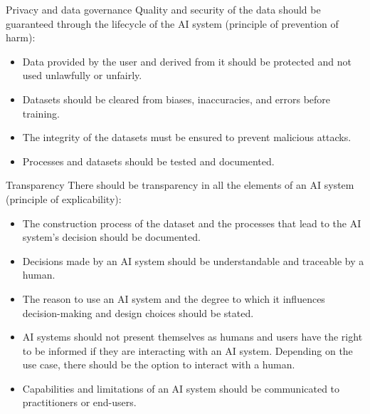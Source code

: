 \begin{descriptionlist}
    \item[Privacy and data governance] 
        Quality and security of the data should be guaranteed through the lifecycle of the AI system (principle of prevention of harm):
        \begin{itemize}
            \item Data provided by the user and derived from it should be protected and not used unlawfully or unfairly.
            \item Datasets should be cleared from biases, inaccuracies, and errors before training.
            \item The integrity of the datasets must be ensured to prevent malicious attacks.
            \item Processes and datasets should be tested and documented.
        \end{itemize}


    \item[Transparency] 
        There should be transparency in all the elements of an AI system (principle of explicability):
        \begin{itemize}
            \item The construction process of the dataset and the processes that lead to the AI system's decision should be documented.
            \item Decisions made by an AI system should be understandable and traceable by a human.
            \item The reason to use an AI system and the degree to which it influences decision-making and design choices should be stated.
            \item AI systems should not present themselves as humans and users have the right to be informed if they are interacting with an AI system. Depending on the use case, there should be the option to interact with a human.
            \item Capabilities and limitations of an AI system should be communicated to practitioners or end-users.
        \end{itemize}



\end{descriptionlist}
